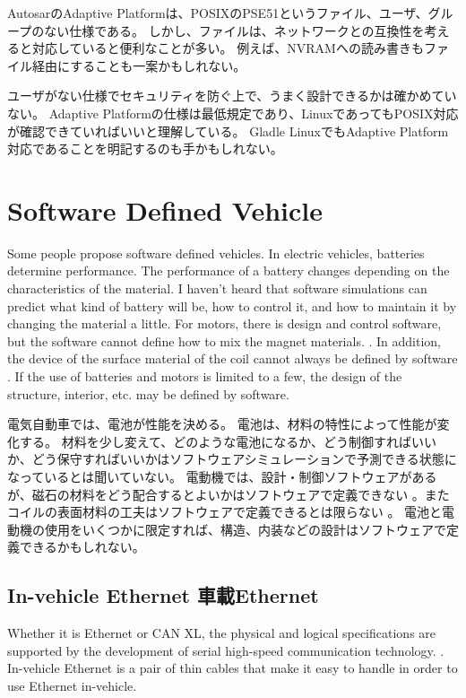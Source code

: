 \documentclass[twocolumn]{article} %
\begin{document}
AutosarのAdaptive Platformは、POSIXのPSE51というファイル、ユーザ、グループのない仕様である\cite{pse51}。
しかし、ファイルは、ネットワークとの互換性を考えると対応していると便利なことが多い。
例えば、NVRAMへの読み書きもファイル経由にすることも一案かもしれない。

ユーザがない仕様でセキュリティを防ぐ上で、うまく設計できるかは確かめていない。
Adaptive Platformの仕様は最低規定であり、LinuxであってもPOSIX対応が確認できていればいいと理解している。
Gladle LinuxでもAdaptive Platform対応であることを明記するのも手かもしれない。

\section{Software Defined Vehicle}
Some people propose  software defined vehicles.
In electric vehicles, batteries determine performance.
The performance of a battery changes depending on the characteristics of the material.
I haven't heard that software simulations can predict what kind of battery will be, how to control it, and how to maintain it by changing the material a little.
For motors, there is design and control software, but the software cannot define how to mix the magnet materials. \cite{motormag}. In addition, the device of the surface material of the coil cannot always be defined by software \cite{motorcoi}.
If the use of batteries and motors is limited to a few, the design of the structure, interior, etc. may be defined by software.

電気自動車では、電池が性能を決める。
電池は、材料の特性によって性能が変化する。
材料を少し変えて、どのような電池になるか、どう制御すればいいか、どう保守すればいいかはソフトウェアシミュレーションで予測できる状態になっているとは聞いていない。
電動機では、設計・制御ソフトウェアがあるが、磁石の材料をどう配合するとよいかはソフトウェアで定義できない\cite{motormag} 。またコイルの表面材料の工夫はソフトウェアで定義できるとは限らない\cite{motorcoi} 。
電池と電動機の使用をいくつかに限定すれば、構造、内装などの設計はソフトウェアで定義できるかもしれない。
\subsection{In-vehicle Ethernet 車載Ethernet}
Whether it is Ethernet or CAN XL, the physical and logical specifications are supported by the development of serial high-speed communication technology. \cite{networki}.
In-vehicle Ethernet is a pair of thin cables that make it easy to handle in order to use Ethernet in-vehicle. \cite{networki}
\end{document}
